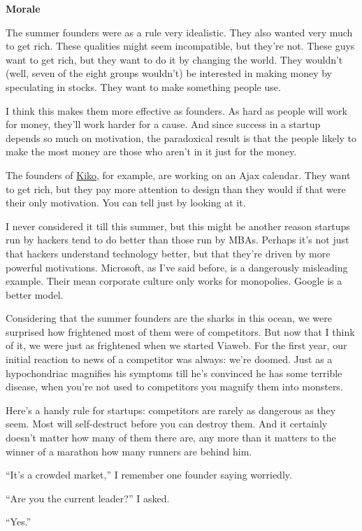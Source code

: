 \documentclass[12pt]{book}
\begin{document}
\textbf{Morale}

The summer founders were as a rule very idealistic. They also wanted
very much to get rich. These qualities might seem incompatible, but
they're not. These guys want to get rich, but they want to do it by
changing the world. They wouldn't (well, seven of the eight groups
wouldn't) be interested in making money by speculating in stocks. They
want to make something people use.

I think this makes them more effective as founders. As hard as people
will work for money, they'll work harder for a cause. And since success
in a startup depends so much on motivation, the paradoxical result is
that the people likely to make the most money are those who aren't in it
just for the money.

The founders of \href{http://kiko.com}{Kiko}, for example, are working
on an Ajax calendar. They want to get rich, but they pay more attention
to design than they would if that were their only motivation. You can
tell just by looking at it.

I never considered it till this summer, but this might be another reason
startups run by hackers tend to do better than those run by MBAs.
Perhaps it's not just that hackers understand technology better, but
that they're driven by more powerful motivations. Microsoft, as I've
said before, is a dangerously misleading example. Their mean corporate
culture only works for monopolies. Google is a better model.

Considering that the summer founders are the sharks in this ocean, we
were surprised how frightened most of them were of competitors. But now
that I think of it, we were just as frightened when we started Viaweb.
For the first year, our initial reaction to news of a competitor was
always: we're doomed. Just as a hypochondriac magnifies his symptoms
till he's convinced he has some terrible disease, when you're not used
to competitors you magnify them into monsters.

Here's a handy rule for startups: competitors are rarely as dangerous as
they seem. Most will self-destruct before you can destroy them. And it
certainly doesn't matter how many of them there are, any more than it
matters to the winner of a marathon how many runners are behind him.

``It's a crowded market,'' I remember one founder saying worriedly.

``Are you the current leader?'' I asked.

``Yes.''
\end{document}
